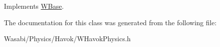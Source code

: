Implements \hyperlink{class_w_base_a76ac973ba9a43e182f6a6a4869d69725}{W\+Base}.



The documentation for this class was generated from the following file\+:\begin{DoxyCompactItemize}
\item 
Wasabi/\+Physics/\+Havok/W\+Havok\+Physics.\+h\end{DoxyCompactItemize}

